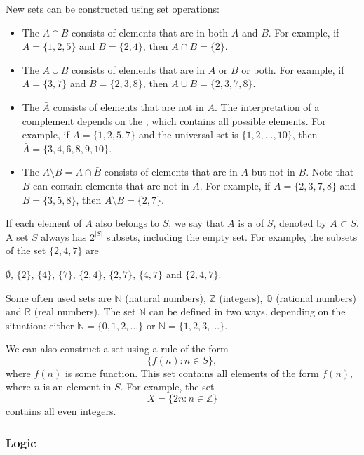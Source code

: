 \begin{samepage}
New sets can be constructed using set operations:
\begin{itemize}
\item The  $A \cap B$ consists of elements
that are in both $A$ and $B$.
For example, if $A=\{1,2,5\}$ and $B=\{2,4\}$,
then $A \cap B = \{2\}$.
\item The  $A \cup B$ consists of elements
that are in $A$ or $B$ or both.
For example, if $A=\{3,7\}$ and $B=\{2,3,8\}$,
then $A \cup B = \{2,3,7,8\}$.
\item The  $\bar A$ consists of elements
that are not in $A$.
The interpretation of a complement depends on
the , which contains all possible elements.
For example, if $A=\{1,2,5,7\}$ and the universal set is
$\{1,2,\ldots,10\}$, then $\bar A = \{3,4,6,8,9,10\}$.
\item The  $A \setminus B = A \cap \bar B$
consists of elements that are in $A$ but not in $B$.
Note that $B$ can contain elements that are not in $A$.
For example, if $A=\{2,3,7,8\}$ and $B=\{3,5,8\}$,
then $A \setminus B = \{2,7\}$.
\end{itemize}
\end{samepage}

If each element of $A$ also belongs to $S$,
we say that $A$ is a  of $S$,
denoted by $A \subset S$.
A set $S$ always has $2^{|S|}$ subsets,
including the empty set.
For example, the subsets of the set $\{2,4,7\}$ are
\begin{center}
$\emptyset$,
$\{2\}$, $\{4\}$, $\{7\}$, $\{2,4\}$, $\{2,7\}$, $\{4,7\}$ and $\{2,4,7\}$.
\end{center}

Some often used sets are
$\mathbb{N}$ (natural numbers),
$\mathbb{Z}$ (integers),
$\mathbb{Q}$ (rational numbers) and
$\mathbb{R}$ (real numbers).
The set $\mathbb{N}$
can be defined in two ways, depending
on the situation:
either $\mathbb{N}=\{0,1,2,\ldots\}$
or $\mathbb{N}=\{1,2,3,...\}$.

We can also construct a set using a rule of the form
\[\{f(n) : n \in S\},\]
where $f(n)$ is some function.
This set contains all elements of the form $f(n)$,
where $n$ is an element in $S$.
For example, the set
\[X=\{2n : n \in \mathbb{Z}\}\]
contains all even integers.

\subsubsection{Logic}

